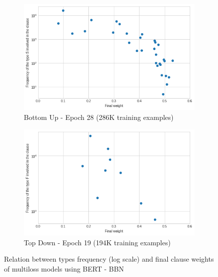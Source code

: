 \begin{figure}
     \centering
     \begin{subfigure}[b]{0.7\textwidth}
         \centering
         \includegraphics[width=\textwidth]{figures/weight_freq_bert_bbn_bu_multiloss.png}
         \caption{Bottom Up - Epoch 28 (286K training examples)}
         \label{fig:weight_freq_bert_bbn_bu_multiloss}
         \vspace{10px}
     \end{subfigure}
     \begin{subfigure}[b]{0.7\textwidth}
         \centering
         \includegraphics[width=\textwidth]{figures/weight_freq_bert_bbn_td_multiloss.png}
         \caption{Top Down - Epoch 19 (194K training examples)}
         \label{fig:weight_freq_bert_bbn_td_multiloss}
     \end{subfigure}
    \caption{Relation between types frequency (log scale) and final clause weights of multiloss models using BERT - BBN}
    \label{fig:weight_freq_bert_bbn}
\end{figure}

